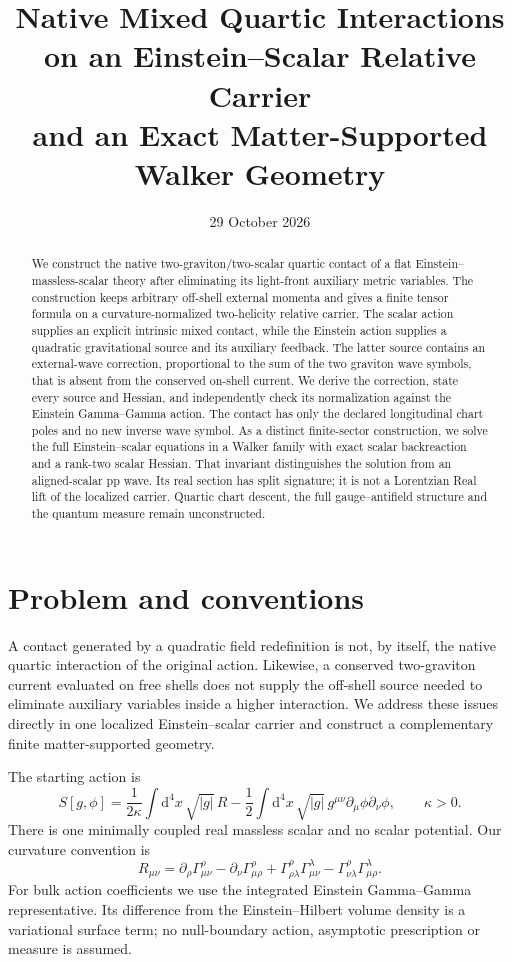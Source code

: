 \documentclass[11pt]{article}
\title{Native Mixed Quartic Interactions on an Einstein--Scalar Relative Carrier\\
\large and an Exact Matter-Supported Walker Geometry}
\author{}
\date{29 October 2026}
\newcommand{\dd}{\mathrm d}
\begin{document}
\maketitle
\begin{abstract}
We construct the native two-graviton/two-scalar quartic contact of a flat Einstein--massless-scalar theory after eliminating its light-front auxiliary metric variables.
The construction keeps arbitrary off-shell external momenta and gives a finite tensor formula on a curvature-normalized two-helicity relative carrier.
The scalar action supplies an explicit intrinsic mixed contact, while the Einstein action supplies a quadratic gravitational source and its auxiliary feedback.
The latter source contains an external-wave correction, proportional to the sum of the two graviton wave symbols, that is absent from the conserved on-shell current.
We derive the correction, state every source and Hessian, and independently check its normalization against the Einstein Gamma--Gamma action.
The contact has only the declared longitudinal chart poles and no new inverse wave symbol.
As a distinct finite-sector construction, we solve the full Einstein--scalar equations in a Walker family with exact scalar backreaction and a rank-two scalar Hessian.
That invariant distinguishes the solution from an aligned-scalar pp wave.
Its real section has split signature; it is not a Lorentzian Real lift of the localized carrier.
Quartic chart descent, the full gauge--antifield structure and the quantum measure remain unconstructed.
\end{abstract}

\section{Problem and conventions}

A contact generated by a quadratic field redefinition is not, by itself, the native quartic interaction of the original action.
Likewise, a conserved two-graviton current evaluated on free shells does not supply the off-shell source needed to eliminate auxiliary variables inside a higher interaction.
We address these issues directly in one localized Einstein--scalar carrier and construct a complementary finite matter-supported geometry.

The starting action is
\begin{equation}
 S[g,\phi]=\frac{1}{2\kappa}\int\dd^4x\,\sqrt{|g|}\,R
 -\frac12\int\dd^4x\,\sqrt{|g|}\,g^{\mu\nu}\partial_\mu\phi\partial_\nu\phi,
 \qquad \kappa>0.
 \label{eq:action}
\end{equation}
There is one minimally coupled real massless scalar and no scalar potential.
Our curvature convention is
\begin{equation}
 R_{\mu\nu}=\partial_\rho\Gamma^\rho_{\mu\nu}
 -\partial_\nu\Gamma^\rho_{\mu\rho}
 +\Gamma^\rho_{\rho\lambda}\Gamma^\lambda_{\mu\nu}
 -\Gamma^\rho_{\nu\lambda}\Gamma^\lambda_{\mu\rho}.
 \label{eq:ricci-convention}
\end{equation}
For bulk action coefficients we use the integrated Einstein Gamma--Gamma representative.
Its difference from the Einstein--Hilbert volume density is a variational surface term; no null-boundary action, asymptotic prescription or measure is assumed.
\end{document}
